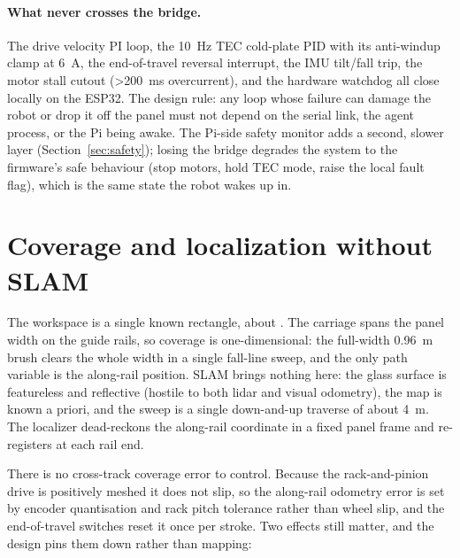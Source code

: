 \documentclass[11pt,a4paper]{article}
\begin{document}
\paragraph{What never crosses the bridge.}
The drive velocity PI loop, the \SI{10}{\hertz} TEC cold-plate PID with its
anti-windup clamp at \SI{6}{\ampere}, the end-of-travel reversal interrupt, the IMU
tilt/fall trip, the motor stall cutout (\SI{>200}{\milli\second} overcurrent), and
the hardware watchdog all close locally on the ESP32. The design rule: any loop
whose failure can damage the robot or drop it off the panel must not depend on the
serial link, the agent process, or the Pi being awake. The Pi-side safety monitor
adds a second, slower layer (Section~\ref{sec:safety}); losing the bridge degrades
the system to the firmware's safe behaviour (stop motors, hold TEC mode, raise the
local fault flag), which is the same state the robot wakes up in.

\section{Coverage and localization without SLAM}
The workspace is a single known rectangle, about . The
carriage spans the panel width on the guide rails, so coverage is one-dimensional:
the full-width \SI{0.96}{\metre} brush clears the whole width in a single fall-line
sweep, and the only path variable is the along-rail position. SLAM brings nothing
here: the glass surface is featureless and reflective (hostile to both lidar and
visual odometry), the map is known a priori, and the sweep is a single
down-and-up traverse of about \SI{4}{\metre}. The localizer dead-reckons the
along-rail coordinate in a fixed panel frame and re-registers at each rail end.

There is no cross-track coverage error to control. Because the rack-and-pinion drive
is positively meshed it does not slip, so the along-rail odometry error is set by
encoder quantisation and rack pitch tolerance rather than wheel slip, and the
end-of-travel switches reset it once per stroke. Two effects still matter, and the
design pins them down rather than mapping:
\end{document}
